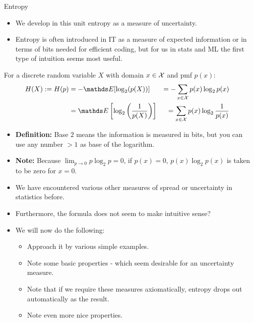 \documentclass[11pt,compress,t,notes=noshow, xcolor=table]{beamer}
\begin{document}
\begin{vbframe}{Entropy}
\begin{itemize}
  \item We develop in this unit entropy as a measure of uncertainty.
  \item Entropy is often introduced in IT as a measure of
    expected information or in terms of bits needed for efficient coding, 
  but for us in stats and ML the first type of intuition seems most useful.
\end{itemize}


For a discrete random variable $X$ with domain $x \in \mathcal{X}$ and pmf $p(x)$:
\begin{equation*}
\begin{aligned} 
  H(X) := H(p) &= - \E[\log_2(p(X))]           &= -\sum_{x \in \Xspace} p(x) \log_2 p(x)\\ 
               &=   \E\left[\log_2\left(\frac{1}{p(X)}\right)\right] &= \sum_{x \in \Xspace} p(x) \log_2 \frac{1}{p(x)} 
\end{aligned} 
\end{equation*}
    \begin{itemize}
  \item \textbf{Definition:}
Base $2$ means the information is measured in bits, but you can use any number $>1$ as base of the logarithm.
    \item \textbf{Note:} Because $\lim _{p \rightarrow 0} p \log_2 p=0$, if $p(x) = 0$, $p(x) \log_2 p(x)$ is taken to be zero for $x=0$.
  \end{itemize}

\framebreak

\begin{itemize}
    \item We have encountered various other measures of spread or uncertainty in statistics before.
    \item Furthermore, the formula does not seem to make intuitive sense?
    \item We will now do the following:
    \begin{itemize}
      \item Approach it by various simple examples.
      \item Note some basic properties - which seem desirable for an uncertainty measure.
      \item Note that if we require these measures axiomatically, entropy drops out automatically as the result.
      \item Note even more nice properties.
  \end{itemize}
\end{itemize}
\end{vbframe}
\end{document}
